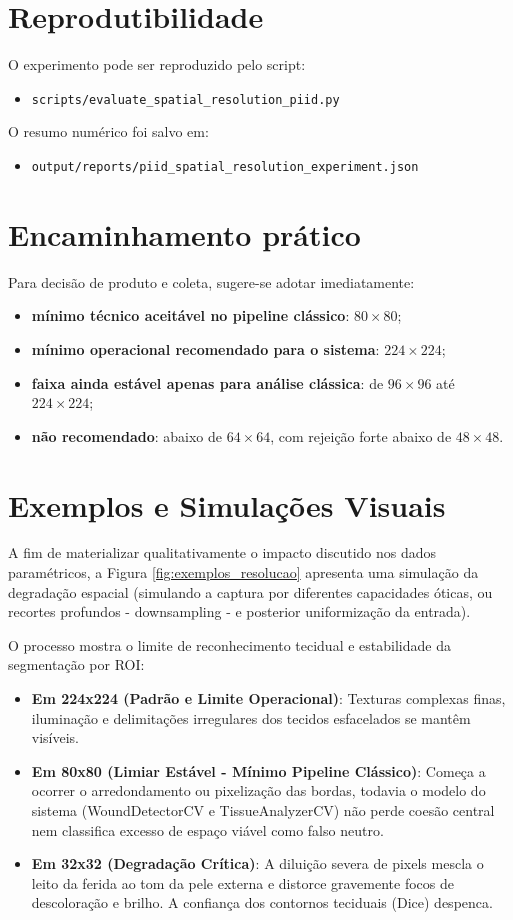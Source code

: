\documentclass[
    12pt,
    openright,
    oneside,
    a4paper,
    chapter=TITLE,
    section=TITLE,
    brazil,
    sumario=tradicional,
    hidelinks
]{abntex2}
\begin{document}
\section{Reprodutibilidade}
O experimento pode ser reproduzido pelo script:
\begin{itemize}
    \item \texttt{scripts/evaluate\_spatial\_resolution\_piid.py}
\end{itemize}

O resumo numérico foi salvo em:
\begin{itemize}
    \item \texttt{output/reports/piid\_spatial\_resolution\_experiment.json}
\end{itemize}

\section{Encaminhamento prático}
Para decisão de produto e coleta, sugere-se adotar imediatamente:
\begin{itemize}
    \item \textbf{mínimo técnico aceitável no pipeline clássico}: \(80 \times 80\);
    \item \textbf{mínimo operacional recomendado para o sistema}: \(224 \times 224\);
    \item \textbf{faixa ainda estável apenas para análise clássica}: de \(96 \times 96\) até \(224 \times 224\);
    \item \textbf{não recomendado}: abaixo de \(64 \times 64\), com rejeição forte abaixo de \(48 \times 48\).
\end{itemize}

\section{Exemplos e Simulações Visuais}
A fim de materializar qualitativamente o impacto discutido nos dados paramétricos, a Figura \ref{fig:exemplos_resolucao} apresenta uma simulação da degradação espacial (simulando a captura por diferentes capacidades óticas, ou recortes profundos - downsampling - e posterior uniformização da entrada).

O processo mostra o limite de reconhecimento tecidual e estabilidade da segmentação por ROI:
\begin{itemize}
    \item \textbf{Em 224x224 (Padrão e Limite Operacional)}: Texturas complexas finas, iluminação e delimitações irregulares dos tecidos esfacelados se mantêm visíveis.
    \item \textbf{Em 80x80 (Limiar Estável - Mínimo Pipeline Clássico)}: Começa a ocorrer o arredondamento ou pixelização das bordas, todavia o modelo do sistema (WoundDetectorCV e TissueAnalyzerCV) não perde coesão central nem classifica excesso de espaço viável como falso neutro.
    \item \textbf{Em 32x32 (Degradação Crítica)}: A diluição severa de pixels mescla o leito da ferida ao tom da pele externa e distorce gravemente focos de descoloração e brilho. A confiança dos contornos teciduais (Dice) despenca.
\end{itemize}
\end{document}
